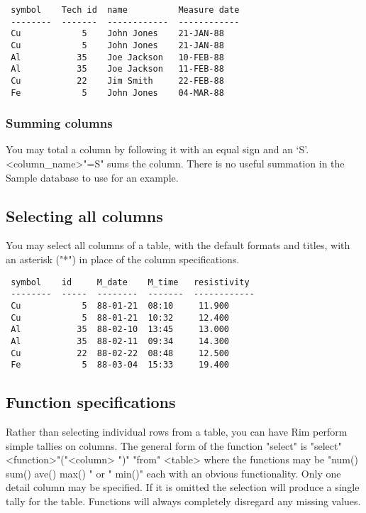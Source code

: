 \begin{verbatim}
 symbol    Tech id  name          Measure date
 --------  -------  ------------  ------------
 Cu            5    John Jones    21-JAN-88
 Cu            5    John Jones    21-JAN-88
 Al           35    Joe Jackson   10-FEB-88
 Al           35    Joe Jackson   11-FEB-88
 Cu           22    Jim Smith     22-FEB-88
 Fe            5    John Jones    04-MAR-88
\end{verbatim}
\enddemo
 
\subsubsection{Summing columns}
You may total a column by following it with an equal sign and an `S'.
\<<column_name>"=S"\>
sums the column.
There is no useful summation in the Sample database
to use for an example.
 
\subsection{Selecting all columns}
\I{*}
You may select all columns of a table, with the default formats
and titles, with an asterisk ("*") in place of the column specifications.
\begin{verbatim}
 symbol    id     M_date    M_time   resistivity
 --------  -----  --------  -------  ------------
 Cu            5  88-01-21  08:10     11.900
 Cu            5  88-01-21  10:32     12.400
 Al           35  88-02-10  13:45     13.000
 Al           35  88-02-11  09:34     14.300
 Cu           22  88-02-22  08:48     12.500
 Fe            5  88-03-04  15:33     19.400
\end{verbatim}
\enddemo
 
\subsection{Function specifications}
Rather than selecting individual rows from a table, you can
have Rim perform simple tallies on columns.
The general form of the function "select" is
\<"select"  <function>"("<column> \opt{\ldots}")"
   \opt{\ldots} "from" <table>\>
where the functions may be
\<"num()  sum()  ave()  max()  " or " min()"\>
each with an obvious functionality.
Only one detail column may be specified.  If it is omitted
the selection will produce a single tally for the table.
Functions will always completely disregard any missing values.
 
